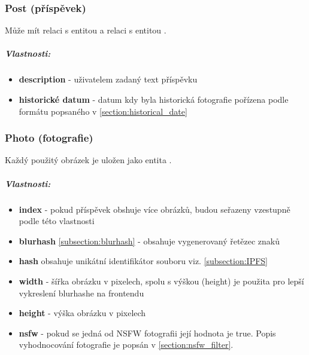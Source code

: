 \documentclass[12pt, a4paper,
 twoside,        %
 openright
]{report}
\newenvironment{propertiesItemize}{
\begin{itemize}{ 
  }}
  {\end{itemize}}
\begin{document}
    	            \subsubsection{Post (příspěvek)}  Může mít relaci  s entitou  a relaci  s entitou .
                          \subparagraph{Vlastnosti:}
 \begin{propertiesItemize}
                                \item \textbf{description} - uživatelem zadaný text příspěvku 
                                \item \textbf{historické datum} - datum kdy byla historická fotografie pořízena podle formátu popsaného v \ref{section:historical_date}
\end{propertiesItemize}
    	            \subsubsection{Photo (fotografie)} Každý použitý obrázek je uložen jako entita .
	                    \subparagraph{Vlastnosti:}  
                           \begin{propertiesItemize}
                                \item \textbf{index} - pokud příspěvek obshuje více obrázků, budou seřazeny vzestupně podle této vlastnosti
                                \item \textbf{blurhash} \ref{subsection:blurhash} - obsahuje vygenerovaný řetězec znaků
                                \item \textbf{hash} obsahuje unikátní identifikátor souboru viz. \ref{subsection:IPFS}
                                \item \textbf{width} - šířka obrázku v pixelech, spolu s výškou (height) je použita pro lepší vykreslení blurhashe na frontendu 
                                \item \textbf{height} - výška obrázku v pixelech
                                \item \textbf{nsfw} - pokud se jedná od NSFW fotografii její hodnota je true. Popis vyhodnocování fotografie je popsán v \ref{section:nsfw_filter}.
                        \end{propertiesItemize}
\end{document}
